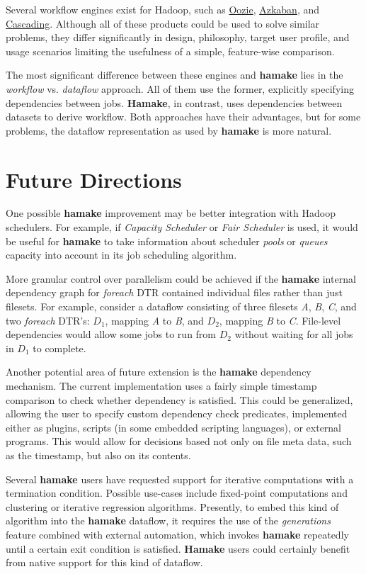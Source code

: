 \documentclass[10pt,conference,letterpaper]{IEEEtran}
\begin{document}
Several workflow engines exist for Hadoop, such as
\href{http://github.com/tucu00/oozie1}{Oozie},
\href{http://sna-projects.com/azkaban/}{Azkaban}, and
\href{http://www.cascading.org/}{Cascading}.  Although all of these
products could be used to solve similar problems, they differ
significantly in design, philosophy, target user profile, and usage
scenarios limiting the usefulness of a simple, feature-wise
comparison.

The most significant difference between these engines and \textbf{hamake}
lies in the \textit{workflow} vs. \textit{dataflow} approach. All of them
use the former, explicitly specifying dependencies between
jobs. \textbf{Hamake}, in contrast, uses dependencies between datasets to derive workflow. Both approaches have their advantages, but for some problems, the dataflow representation as used by
\textbf{hamake} is more natural.

\section{Future Directions}

One possible \textbf{hamake} improvement may be better integration with Hadoop schedulers. For example, if \textit{Capacity Scheduler} or \textit{Fair Scheduler} is used, it would be useful for \textbf{hamake} to take information about scheduler \textit{pools} or \textit{queues} capacity into account in its job scheduling algorithm.

More granular control over parallelism could be achieved if the
\textbf{hamake} internal dependency graph for \emph{foreach} DTR
contained individual files rather than just filesets. For example, consider a
dataflow consisting of three filesets \textit{A}, \textit{B},
\textit{C}, and two \emph{foreach} DTR's: \textit{$D_1$}, mapping
\textit{A} to \textit{B}, and \textit{$D_2$}, mapping \textit{B} to
\textit{C}. File-level dependencies would allow some jobs to run from
\textit{$D_2$} without waiting for all jobs in \textit{$D_1$} to
complete.

Another potential area of future extension is the \textbf{hamake} dependency
mechanism. The current implementation uses a fairly simple timestamp
comparison to check whether dependency is satisfied. This could be
generalized, allowing the user to specify custom dependency check
predicates, implemented either as plugins, scripts 
(in some embedded
scripting languages), or external programs. This would allow for
decisions based not only on file meta data, such as the timestamp, but also on its contents.

Several \textbf{hamake} users have requested support for iterative computations with a termination condition. Possible use-cases include fixed-point computations and clustering or iterative regression algorithms. Presently, to embed this kind of algorithm into the \textbf{hamake} dataflow, it requires the use of the \textit{generations} feature combined with external automation, which invokes \textbf{hamake} repeatedly until a certain exit condition is satisfied. \textbf{Hamake} users could
certainly benefit from native support for this kind of dataflow.



\end{document}
